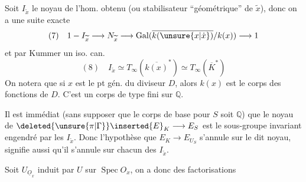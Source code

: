 Soit $I_{\widetilde x}$ le noyau de l'hom. obtenu
(ou stabilisateur ``géométrique'' de $\widetilde x$), donc
on a une suite exacte
\[
(7)\quad 1-I_{\widetilde x}\longrightarrow N_{\widetilde x}\longrightarrow\operatorname{Gal}(\overline{k(\unsure{x|\dot{x}})}/k(x))\longrightarrow1
\]
et par Kummer un iso. can.
\[
(8)\quad I_{\widetilde x}\simeq T_\infty(\overline{k(x)}^*)\simeq T_\infty(\overline K^*)
\]
On notera que si $x$ est le pt gén. du
diviseur $D$, alors $k(x)$ est le corps des
fonctions de $D$. C'est un corps de
type fini sur $\mathbb Q$.

Il est immédiat (sans supposer que le
corps de base pour $S$ soit $\mathbb Q$) que
le noyau de $\deleted{\unsure{\pi|\Gamma}}\inserted{E}_K\longrightarrow E_S$ est le sous-groupe
invariant engendré par les $I_{\widetilde x}$. Donc
l'hypothèse que $E_K\longrightarrow E_{U_S}$ s'annule
sur le dit noyau, signifie aussi qu'il
s'annule sur chacun des $I_{\widetilde x}$.

Soit  $U_{\underline O_x}$ induit par $U$ sur
$\operatorname{Spec}O_x$, on a donc des factorisations
